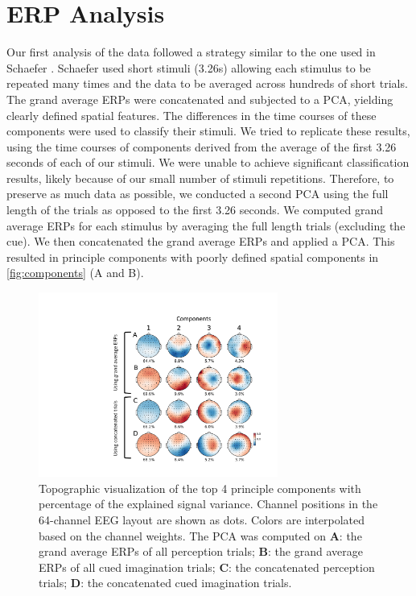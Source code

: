 \chapter{ERP Analysis}

Our first analysis of the data followed a strategy similar to the one used in Schaefer \etal \citeyear{schaefer_name_2011}.
Schaefer \etal \citeyear{schaefer_name_2011} used short stimuli (3.26s) allowing each stimulus to be repeated many times and the data to be averaged across hundreds of short trials. 
The grand average \acp{ERP} were concatenated and subjected to a \ac{PCA}, yielding clearly defined spatial features. 
The differences in the time courses of these components were used to classify their stimuli. 
We tried to replicate these results, using the time courses of components derived from the average of the first 3.26 seconds of each of our stimuli. 
We were unable to achieve significant classification results, likely because of our small number of stimuli repetitions.
Therefore, to preserve as much data as possible, we conducted a second \ac{PCA} using the full length of the trials as opposed to the first 3.26 seconds. 
We computed grand average \acp{ERP} for each stimulus by averaging the full length trials (excluding the cue).
We then concatenated the grand average \acp{ERP} and applied a \ac{PCA}. 
This resulted in principle components with poorly defined spatial components in \autoref{fig:components} (A and B).
\begin{figure}[htb]	%
  \centerline{\includegraphics[width=0.7\textwidth]{Figures/principal_components_labels.pdf}}
  \caption{Topographic visualization of the top 4 principle components with percentage of the explained signal variance. Channel positions in the 64-channel EEG layout are shown as dots. Colors are interpolated based on the channel weights. The PCA was computed on {\bf A}: the grand average \acp{ERP} of all perception trials; {\bf B}: the grand average \acp{ERP} of all cued imagination trials; {\bf C}: the concatenated perception trials; {\bf D}: the concatenated cued imagination trials.}
  \label{fig:components}
\end{figure}


